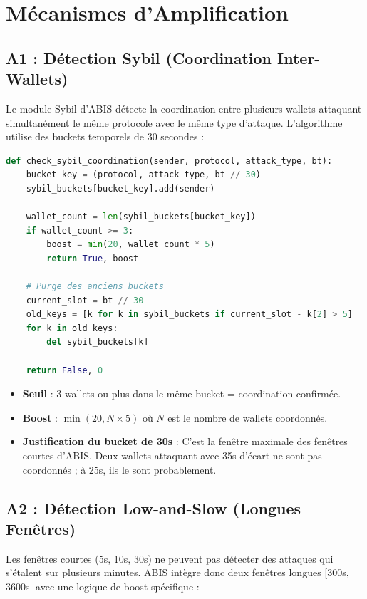 \documentclass[12pt,a4paper]{report}
\begin{document}
\section{Mécanismes d'Amplification}

\subsection{A1 : Détection Sybil (Coordination Inter-Wallets)}

Le module Sybil d'ABIS détecte la coordination entre plusieurs wallets attaquant simultanément le même protocole avec le même type d'attaque. L'algorithme utilise des buckets temporels de 30 secondes :

\begin{lstlisting}[language=Python, caption={Détection Sybil}, label={lst:sybil_detection}]
def check_sybil_coordination(sender, protocol, attack_type, bt):
    bucket_key = (protocol, attack_type, bt // 30)
    sybil_buckets[bucket_key].add(sender)

    wallet_count = len(sybil_buckets[bucket_key])
    if wallet_count >= 3:
        boost = min(20, wallet_count * 5)
        return True, boost

    # Purge des anciens buckets
    current_slot = bt // 30
    old_keys = [k for k in sybil_buckets if current_slot - k[2] > 5]
    for k in old_keys:
        del sybil_buckets[k]

    return False, 0
\end{lstlisting}

\begin{itemize}
  \item \textbf{Seuil} : 3 wallets ou plus dans le même bucket = coordination confirmée.
  \item \textbf{Boost} : $\min(20, N \times 5)$ où $N$ est le nombre de wallets coordonnés.
  \item \textbf{Justification du bucket de 30s} : C'est la fenêtre maximale des fenêtres courtes d'ABIS. Deux wallets attaquant avec 35s d'écart ne sont pas coordonnés ; à 25s, ils le sont probablement.
\end{itemize}

\subsection{A2 : Détection Low-and-Slow (Longues Fenêtres)}

Les fenêtres courtes (5s, 10s, 30s) ne peuvent pas détecter des attaques qui s'étalent sur plusieurs minutes. ABIS intègre donc deux fenêtres longues [300s, 3600s] avec une logique de boost spécifique :
\end{document}
